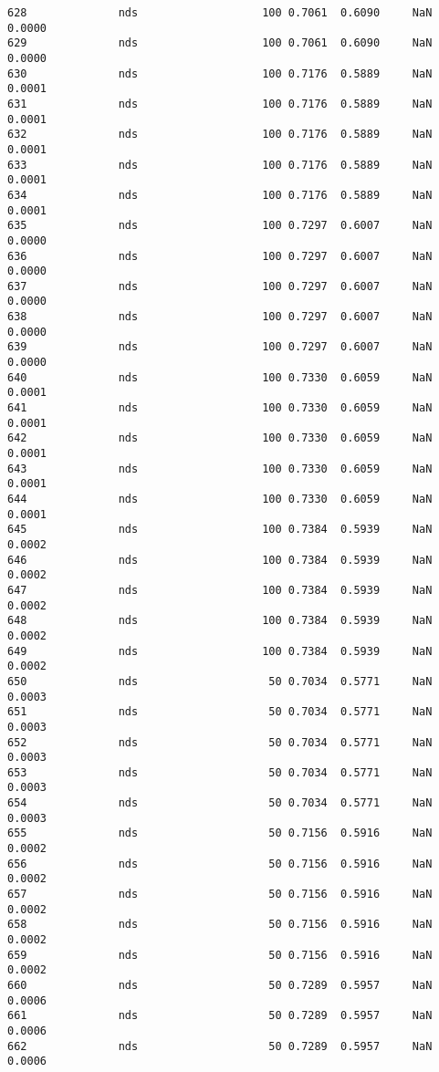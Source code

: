 \documentclass[11pt]{article}
\begin{document}
\begin{Verbatim}[commandchars=\\\{\}]
628              nds                   100 0.7061  0.6090     NaN 0.0000   
629              nds                   100 0.7061  0.6090     NaN 0.0000   
630              nds                   100 0.7176  0.5889     NaN 0.0001   
631              nds                   100 0.7176  0.5889     NaN 0.0001   
632              nds                   100 0.7176  0.5889     NaN 0.0001   
633              nds                   100 0.7176  0.5889     NaN 0.0001   
634              nds                   100 0.7176  0.5889     NaN 0.0001   
635              nds                   100 0.7297  0.6007     NaN 0.0000   
636              nds                   100 0.7297  0.6007     NaN 0.0000   
637              nds                   100 0.7297  0.6007     NaN 0.0000   
638              nds                   100 0.7297  0.6007     NaN 0.0000   
639              nds                   100 0.7297  0.6007     NaN 0.0000   
640              nds                   100 0.7330  0.6059     NaN 0.0001   
641              nds                   100 0.7330  0.6059     NaN 0.0001   
642              nds                   100 0.7330  0.6059     NaN 0.0001   
643              nds                   100 0.7330  0.6059     NaN 0.0001   
644              nds                   100 0.7330  0.6059     NaN 0.0001   
645              nds                   100 0.7384  0.5939     NaN 0.0002   
646              nds                   100 0.7384  0.5939     NaN 0.0002   
647              nds                   100 0.7384  0.5939     NaN 0.0002   
648              nds                   100 0.7384  0.5939     NaN 0.0002   
649              nds                   100 0.7384  0.5939     NaN 0.0002   
650              nds                    50 0.7034  0.5771     NaN 0.0003   
651              nds                    50 0.7034  0.5771     NaN 0.0003   
652              nds                    50 0.7034  0.5771     NaN 0.0003   
653              nds                    50 0.7034  0.5771     NaN 0.0003   
654              nds                    50 0.7034  0.5771     NaN 0.0003   
655              nds                    50 0.7156  0.5916     NaN 0.0002   
656              nds                    50 0.7156  0.5916     NaN 0.0002   
657              nds                    50 0.7156  0.5916     NaN 0.0002   
658              nds                    50 0.7156  0.5916     NaN 0.0002   
659              nds                    50 0.7156  0.5916     NaN 0.0002   
660              nds                    50 0.7289  0.5957     NaN 0.0006   
661              nds                    50 0.7289  0.5957     NaN 0.0006   
662              nds                    50 0.7289  0.5957     NaN 0.0006   

\end{Verbatim}
\end{document}
